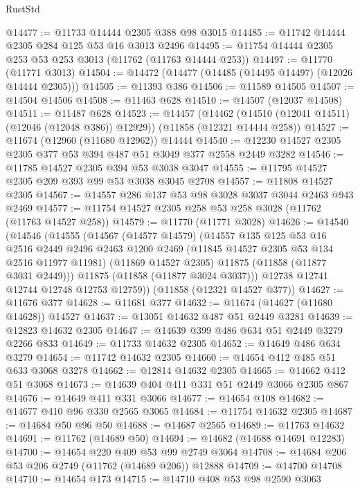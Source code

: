 \begin{lexlean}{RustStd}
\begin{coremodule}
@14477 := @11733 @14444 @2305 @388 @98 @3015
@14485 := @11742 @14444 @2305 @284 @125 @53 @16 @3013 @2496
@14495 := @11754 @14444 @2305 @253 @53 @253 @3013 (@11762 (@11763 @14444 @253))
@14497 := @11770 (@11771 @3013)
@14504 := @14472 (@14477 (@14485 (@14495 @14497) (@12026 @14444 @2305)))
@14505 := @11393 @386
@14506 := @11589 @14505
@14507 := @14504 @14506
@14508 := @11463 @628
@14510 := @14507 (@12037 @14508)
@14511 := @11487 @628
@14523 := @14457
    (@14462 (@14510 (@12041 @14511) (@12046 (@12048 @386)) @12929))
    (@11858 (@12321 @14444 @258))
@14527 := @11674 (@12960 (@11680 @12962)) @14444
@14540 := @12230 @14527 @2305 @2305 @377 @53 @394 @487 @51 @3049 @377 @2558 @2449 @3282
@14546 := @11785 @14527 @2305 @394 @53 @3038 @3047
@14555 := @11795 @14527 @2305 @209 @393 @99 @53 @3038 @3045 @2708
@14557 := @11808 @14527 @2305
@14567 := @14557 @286 @137 @53 @98 @3028 @3037 @3044 @2463 @943 @2469
@14577 := @11754 @14527 @2305 @258 @53 @258 @3028 (@11762 (@11763 @14527 @258))
@14579 := @11770 (@11771 @3028)
@14626 := @14540
    (@14546
      (@14555
        (@14567
          (@14577 @14579)
          (@14557
            @135
            @125
            @53
            @16
            @2516
            @2449
            @2496
            @2463
            @1200
            @2469
            (@11845 @14527 @2305 @53 @134 @2516 @11977 @11981)
            (@11869 @14527 @2305)
            @11875
            (@11858 (@11877 @3031 @2449)))
          @11875
          (@11858 (@11877 @3024 @3037)))
        @12738
        @12741
        @12744
        @12748
        @12753
        @12759))
    (@11858 (@12321 @14527 @377))
@14627 := @11676 @377
@14628 := @11681 @377
@14632 := @11674 (@14627 (@11680 @14628)) @14527
@14637 := @13051 @14632 @487 @51 @2449 @3281
@14639 := @12823 @14632 @2305
@14647 := @14639 @399 @486 @634 @51 @2449 @3279 @2266 @833
@14649 := @11733 @14632 @2305
@14652 := @14649 @486 @634 @3279
@14654 := @11742 @14632 @2305
@14660 := @14654 @412 @485 @51 @633 @3068 @3278
@14662 := @12814 @14632 @2305
@14665 := @14662 @412 @51 @3068
@14673 := @14639 @404 @411 @331 @51 @2449 @3066 @2305 @867
@14676 := @14649 @411 @331 @3066
@14677 := @14654 @108
@14682 := @14677 @410 @96 @330 @2565 @3065
@14684 := @11754 @14632 @2305
@14687 := @14684 @50 @96 @50
@14688 := @14687 @2565
@14689 := @11763 @14632
@14691 := @11762 (@14689 @50)
@14694 := @14682 (@14688 @14691 @12283)
@14700 := @14654 @220 @409 @53 @99 @2749 @3064
@14708 := @14684 @206 @53 @206 @2749 (@11762 (@14689 @206)) @12888
@14709 := @14700 @14708
@14710 := @14654 @173
@14715 := @14710 @408 @53 @98 @2590 @3063

\end{coremodule}
\end{lexlean}
